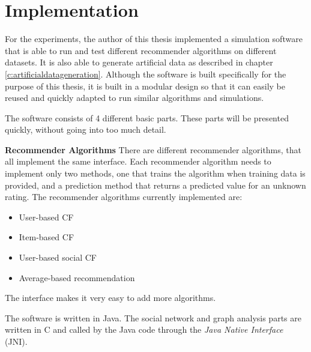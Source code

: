 \chapter{Implementation}
\label{c:implementation} For the experiments, the author of this thesis implemented a simulation software that is able to run and test different recommender algorithms on different datasets. It is also able to generate artificial data as described in chapter \ref{c:artificialdatageneration}. Although the software is built specifically for the purpose of this thesis, it is built in a modular design so that it can easily be reused and quickly adapted to run similar algorithms and simulations.
\newline

The software consists of 4 different basic parts. These parts will be presented quickly, without going into too much detail.
\newline

\textbf{Recommender Algorithms} There are different recommender algorithms, that all implement the same interface. Each recommender algorithm needs to implement only two methods, one that trains the algorithm when training data is provided, and a prediction method that returns a predicted value for an unknown rating. The recommender algorithms currently implemented are:

\begin{itemize}
\item User-based CF
\item Item-based CF
\item User-based social CF
\item Average-based recommendation
\end{itemize}

The interface makes it very easy to add more algorithms.
\newline
\newline

The software is written in Java. The social network and graph analysis parts are written in C and called by the Java code through the \textit{Java Native Interface} (JNI).
